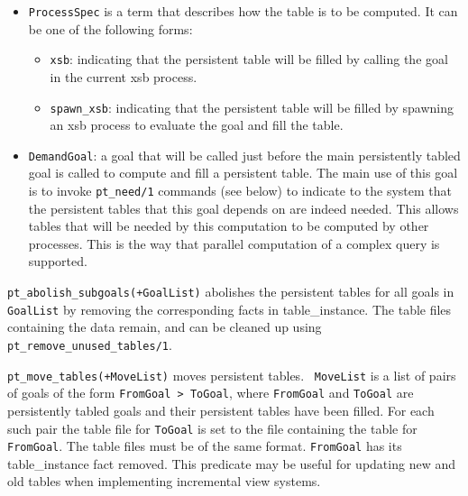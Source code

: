 \begin{description}
\begin{itemize}
\begin{itemize}
\end{itemize}

\item{{\tt ProcessSpec}} is a term that describes how the table is to
be computed.  It can be one of the following forms:

\begin{itemize}

\item{{\tt xsb}}: indicating that the persistent table will be filled by
calling the goal in the current xsb process.

\item{{\tt spawn\_xsb}}: indicating that the persistent table will be
filled by spawning an xsb process to evaluate the goal and fill the table.

\end{itemize}

\item{{\tt DemandGoal}}: a goal that will be called just before the
main persistently tabled goal is called to compute and fill a persistent
table.  The main use of this goal is to invoke {\tt pt\_need/1}
commands (see below) to indicate to the system that the persistent
tables that this goal depends on are indeed needed.  This allows
tables that will be needed by this computation to be computed by other
processes.  This is the way that parallel computation of a complex
query is supported.

\end{itemize}

%
{\tt pt\_abolish\_subgoals(+GoalList)} abolishes the persistent tables
for all goals in {\tt GoalList} by removing the corresponding facts in
table\_instance. The table files containing the data remain, and can be
cleaned up using {\tt pt\_remove\_unused\_tables/1}.  

%
{\tt pt\_move\_tables(+MoveList)} moves persistent tables.  {\tt
  MoveList} is a list of pairs of goals of the form {\tt FromGoal >
  ToGoal}, where {\tt FromGoal} and {\tt ToGoal} are persistently
tabled goals and their persistent tables have been filled.  For each
such pair the table file for {\tt ToGoal} is set to the file
containing the table for {\tt FromGoal}.  The table files must be of
the same format.  {\tt FromGoal} has its table\_instance fact removed.
This predicate may be useful for updating new and old tables when
implementing incremental view systems.


\end{description}
